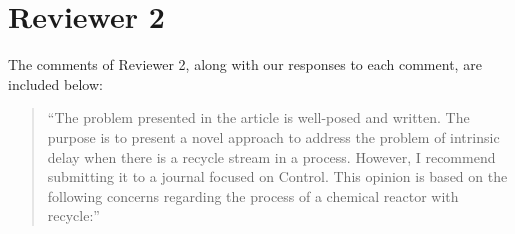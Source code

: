 \documentclass[12pt,answers]{exam}
\begin{document}
\newpage

\section*{Reviewer 2}

The comments of Reviewer 2, along with our responses to each comment, are included below:

\begin{quote}
    ``The problem presented in the article is well-posed and written. The purpose is to present a novel approach to address the problem of intrinsic delay when there is a recycle stream in a process. However, I recommend submitting it to a journal focused on Control. This opinion is based on the following concerns regarding the process of a chemical reactor with recycle:''
\end{quote}
\end{document}
